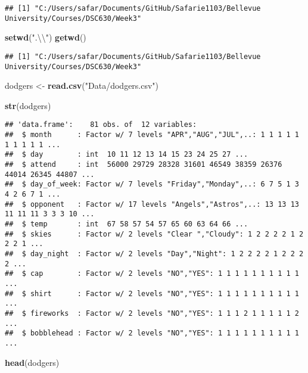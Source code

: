 \documentclass[
]{article}
\newenvironment{Shaded}{\begin{snugshade}}{\end{snugshade}}
\newcommand{\CharTok}[1]{\textcolor[rgb]{0.31,0.60,0.02}{#1}}
\newcommand{\KeywordTok}[1]{\textcolor[rgb]{0.13,0.29,0.53}{\textbf{#1}}}
\newcommand{\NormalTok}[1]{#1}
\newcommand{\StringTok}[1]{\textcolor[rgb]{0.31,0.60,0.02}{#1}}
\begin{document}
\begin{verbatim}
## [1] "C:/Users/safar/Documents/GitHub/Safarie1103/Bellevue University/Courses/DSC630/Week3"
\end{verbatim}

\begin{Shaded}
\begin{Highlighting}[]
\KeywordTok{setwd}\NormalTok{(}\StringTok{".}\CharTok{\textbackslash{}\textbackslash{}}\StringTok{"}\NormalTok{)}
\KeywordTok{getwd}\NormalTok{()}
\end{Highlighting}
\end{Shaded}

\begin{verbatim}
## [1] "C:/Users/safar/Documents/GitHub/Safarie1103/Bellevue University/Courses/DSC630/Week3"
\end{verbatim}

\begin{Shaded}
\begin{Highlighting}[]
\NormalTok{dodgers <-}\StringTok{ }\KeywordTok{read.csv}\NormalTok{(}\StringTok{"Data/dodgers.csv"}\NormalTok{)}

\KeywordTok{str}\NormalTok{(dodgers) }
\end{Highlighting}
\end{Shaded}

\begin{verbatim}
## 'data.frame':    81 obs. of  12 variables:
##  $ month      : Factor w/ 7 levels "APR","AUG","JUL",..: 1 1 1 1 1 1 1 1 1 1 ...
##  $ day        : int  10 11 12 13 14 15 23 24 25 27 ...
##  $ attend     : int  56000 29729 28328 31601 46549 38359 26376 44014 26345 44807 ...
##  $ day_of_week: Factor w/ 7 levels "Friday","Monday",..: 6 7 5 1 3 4 2 6 7 1 ...
##  $ opponent   : Factor w/ 17 levels "Angels","Astros",..: 13 13 13 11 11 11 3 3 3 10 ...
##  $ temp       : int  67 58 57 54 57 65 60 63 64 66 ...
##  $ skies      : Factor w/ 2 levels "Clear ","Cloudy": 1 2 2 2 2 1 2 2 2 1 ...
##  $ day_night  : Factor w/ 2 levels "Day","Night": 1 2 2 2 2 1 2 2 2 2 ...
##  $ cap        : Factor w/ 2 levels "NO","YES": 1 1 1 1 1 1 1 1 1 1 ...
##  $ shirt      : Factor w/ 2 levels "NO","YES": 1 1 1 1 1 1 1 1 1 1 ...
##  $ fireworks  : Factor w/ 2 levels "NO","YES": 1 1 1 2 1 1 1 1 1 2 ...
##  $ bobblehead : Factor w/ 2 levels "NO","YES": 1 1 1 1 1 1 1 1 1 1 ...
\end{verbatim}

\begin{Shaded}
\begin{Highlighting}[]
\KeywordTok{head}\NormalTok{(dodgers)}
\end{Highlighting}
\end{Shaded}
\end{document}
